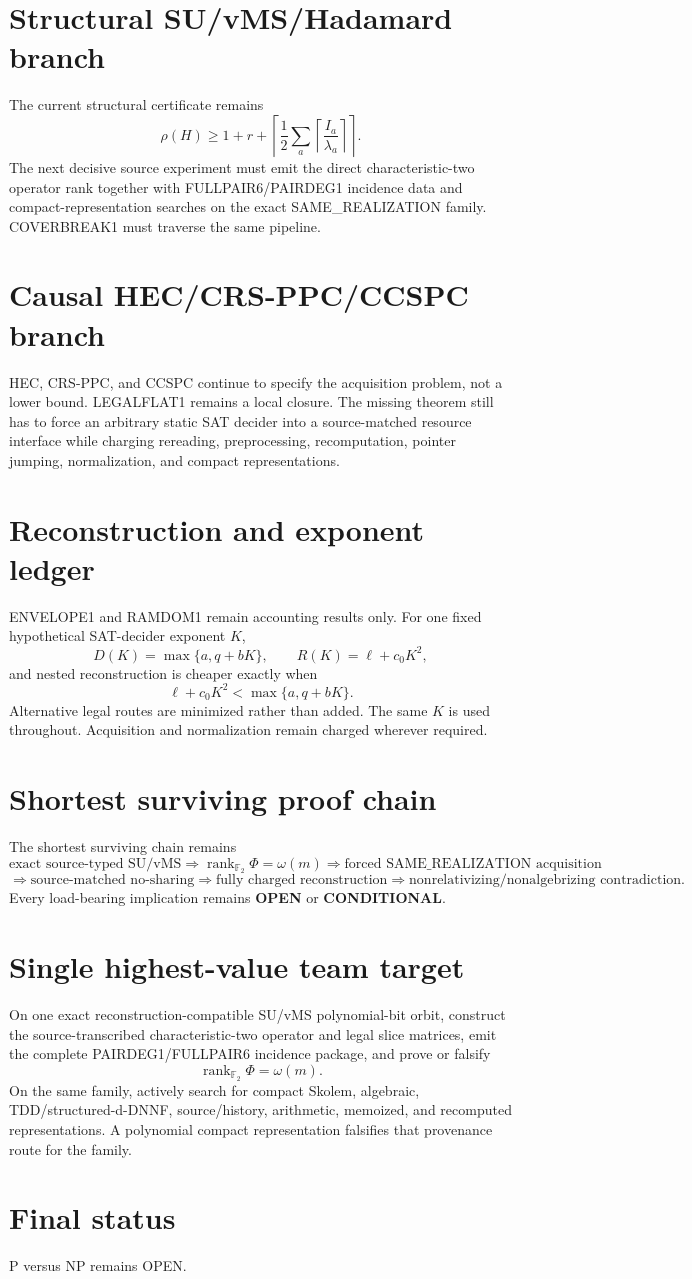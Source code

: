 \documentclass[11pt]{article}
\begin{document}
\section*{Structural SU/vMS/Hadamard branch}
The current structural certificate remains
\[
\rho(H)\ge
1+r+
\left\lceil\frac12\sum_a
\left\lceil\frac{I_a}{\lambda_a}\right\rceil
\right\rceil.
\]
The next decisive source experiment must emit the direct characteristic-two operator rank together with FULLPAIR6/PAIRDEG1 incidence data and compact-representation searches on the exact SAME\_REALIZATION family. COVERBREAK1 must traverse the same pipeline.

\section*{Causal HEC/CRS-PPC/CCSPC branch}
HEC, CRS-PPC, and CCSPC continue to specify the acquisition problem, not a lower bound. LEGALFLAT1 remains a local closure. The missing theorem still has to force an arbitrary static SAT decider into a source-matched resource interface while charging rereading, preprocessing, recomputation, pointer jumping, normalization, and compact representations.

\section*{Reconstruction and exponent ledger}
ENVELOPE1 and RAMDOM1 remain accounting results only. For one fixed hypothetical SAT-decider exponent \(K\),
\[
D(K)=\max\{a,q+bK\},\qquad
R(K)=\ell+c_0K^2,
\]
and nested reconstruction is cheaper exactly when
\[
\ell+c_0K^2<\max\{a,q+bK\}.
\]
Alternative legal routes are minimized rather than added. The same \(K\) is used throughout. Acquisition and normalization remain charged wherever required.

\section*{Shortest surviving proof chain}
The shortest surviving chain remains
\[
\text{exact source-typed SU/vMS}
\Longrightarrow
\operatorname{rank}_{\mathbb F_2}\Phi=\omega(m)
\Longrightarrow
\text{forced SAME\_REALIZATION acquisition}
\]
\[
\Longrightarrow
\text{source-matched no-sharing}
\Longrightarrow
\text{fully charged reconstruction}
\Longrightarrow
\text{nonrelativizing/nonalgebrizing contradiction}.
\]
Every load-bearing implication remains \textbf{OPEN} or \textbf{CONDITIONAL}.

\section*{Single highest-value team target}
On one exact reconstruction-compatible SU/vMS polynomial-bit orbit, construct the source-transcribed characteristic-two operator and legal slice matrices, emit the complete PAIRDEG1/FULLPAIR6 incidence package, and prove or falsify
\[
\boxed{\operatorname{rank}_{\mathbb F_2}\Phi=\omega(m)}.
\]
On the same family, actively search for compact Skolem, algebraic, TDD/structured-d-DNNF, source/history, arithmetic, memoized, and recomputed representations. A polynomial compact representation falsifies that provenance route for the family.

\section*{Final status}
P versus NP remains OPEN.

\end{document}
